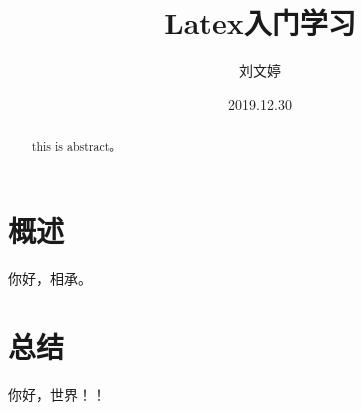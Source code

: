 \documentclass{article}
\author{ 刘文婷 }
\date {2019.12.30}
\title{Latex入门学习}
\begin{document}
\maketitle
\begin{center}
\end{center}


\tableofcontents 

\begin{abstract}
this is abstract。
\end{abstract}

\section{概述}
你好，相承。

\section{总结}
你好，世界！！ 



\end{document}
